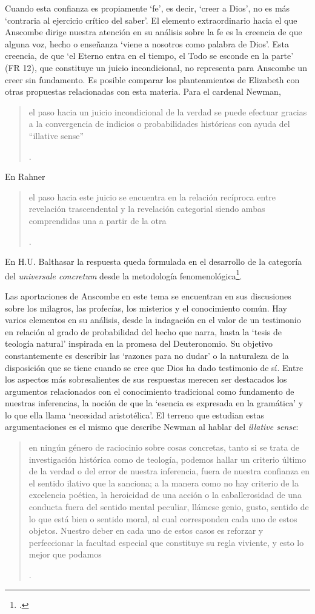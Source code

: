 Cuando esta confianza es propiamente `fe', es decir, `creer a Dios', no es más `contraria al ejercicio crítico del saber'. El elemento extraordinario hacia el que Anscombe dirige nuestra atención en su análisis sobre la fe es la creencia de que alguna voz, hecho o enseñanza \enquote*{viene a nosotros como palabra de Dios}. Esta creencia, de que \enquote*{el Eterno entra en el tiempo, el Todo se esconde en la parte} (FR 12), que constituye un juicio incondicional, no representa para Anscombe un creer sin fundamento. Es posible comparar los planteamientos de Elizabeth con otras propuestas relacionadas con esta materia. Para el cardenal Newman, \blockquote[{\Cite[276-277]{ninot2009tf}}.]{el paso hacia un juicio incondicional de la verdad se puede efectuar gracias a la convergencia de indicios o probabilidades históricas con ayuda del ``illative sense''}. En Rahner \blockquote[{\Cite[277]{ninot2009tf}}.]{el paso hacia este juicio se encuentra en la relación recíproca entre revelación trascendental \textelp{} y la revelación categorial \textelp{} siendo ambas comprendidas una a partir de la otra}. En H.U. Balthasar la respuesta queda formulada en el desarrollo de la categoría del \emph{universale concretum} desde la metodología fenomenológica\footcite[277]{ninot2009tf}.

Las aportaciones de Anscombe en este tema se encuentran en sus discusiones sobre los milagros, las profecías, los misterios y el conocimiento común. Hay varios elementos en su análisis, desde la indagación en el valor de un testimonio en relación al grado de probabilidad del hecho que narra, hasta la `tesis de teología natural' inspirada en la promesa del Deuteronomio. Su objetivo constantemente es describir las `razones para no dudar' o la naturaleza de la disposición que se tiene cuando se cree que Dios ha dado testimonio de sí. Entre los aspectos más sobresalientes de sus respuestas merecen ser destacados los argumentos relacionados con el conocimiento tradicional como fundamento de nuestras inferencias, la noción de que la `esencia es expresada en la gramática' y lo que ella llama `necesidad aristotélica'. El terreno que estudian estas argumentaciones es el mismo que describe Newman al hablar del \emph{illative sense}: \blockquote[{\Cite[317]{newman1870assent}}.]{en ningún género de raciocinio sobre cosas concretas, tanto si se trata de investigación histórica como de teología, podemos hallar un criterio último de la verdad o del error de nuestra inferencia, fuera de nuestra confianza en el sentido ilativo que la sanciona; a la manera como no hay criterio de la excelencia poética, la heroicidad de una acción o la caballerosidad de una conducta fuera del sentido mental peculiar, llámese genio, gusto, sentido de lo que está bien o sentido moral, al cual corresponden cada uno de estos objetos. Nuestro deber en cada uno de estos casos es reforzar y perfeccionar la facultad especial que constituye su regla viviente, y esto lo mejor que podamos}.


